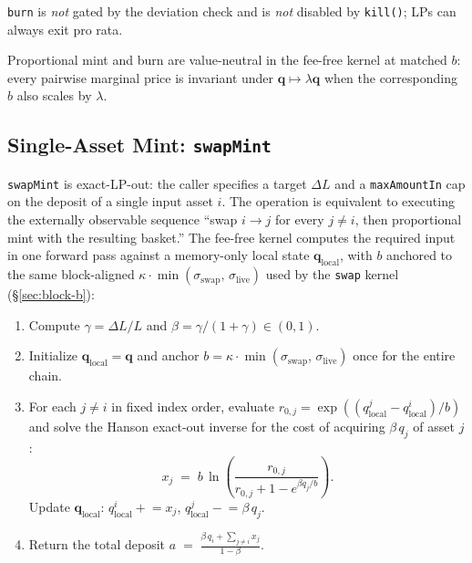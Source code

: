 \documentclass[11pt]{article}
\begin{document}
\texttt{burn} is \emph{not} gated by the deviation check and is
\emph{not} disabled by \texttt{kill()}; LPs can always exit pro rata.

Proportional mint and burn are value-neutral in the fee-free kernel at
matched $b$: every pairwise marginal price is invariant under
$\mathbf{q} \mapsto \lambda\mathbf{q}$ when the corresponding $b$ also
scales by $\lambda$.

\subsection{Single-Asset Mint: \texttt{swapMint}}
\label{sec:swapmint}

\texttt{swapMint} is exact-LP-out: the caller specifies a target
$\Delta L$ and a \texttt{maxAmountIn} cap on the deposit of a single
input asset $i$. The operation is equivalent to executing the
externally observable sequence ``swap $i \to j$ for every $j \ne i$,
then proportional mint with the resulting basket.'' The fee-free
kernel computes the required input in one forward pass against a
memory-only local state $\mathbf{q}_{\mathrm{local}}$, with $b$
anchored to the same block-aligned $\kappa \cdot
\min(\sigma_{\mathrm{swap}},\,\sigma_{\mathrm{live}})$ used by the
\texttt{swap} kernel (\S\ref{sec:block-b}):

\begin{enumerate}
  \item Compute $\gamma = \Delta L / L$ and
        $\beta = \gamma/(1+\gamma) \in (0,1)$.
  \item Initialize $\mathbf{q}_{\mathrm{local}} = \mathbf{q}$ and
        anchor $b = \kappa \cdot \min(\sigma_{\mathrm{swap}},\,
        \sigma_{\mathrm{live}})$ once for the entire chain.
  \item For each $j \ne i$ in fixed index order, evaluate
        $r_{0,j} = \exp((q_{\mathrm{local}}^j -
        q_{\mathrm{local}}^i)/b)$ and solve the Hanson exact-out
        inverse for the cost of acquiring $\beta\,q_j$ of asset $j$:
        \[
          x_j \;=\; b\,\ln\!\left(
            \frac{r_{0,j}}{r_{0,j} + 1 - e^{\beta q_j / b}}\right).
        \]
        Update $\mathbf{q}_{\mathrm{local}}$:
        $q_{\mathrm{local}}^i \mathrel{+}{=} x_j$,
        $q_{\mathrm{local}}^j \mathrel{-}{=} \beta\,q_j$.
  \item Return the total deposit
        $\displaystyle a \;=\; \frac{\beta\,q_i + \sum_{j \ne i} x_j}{1 - \beta}.$
\end{enumerate}
\end{document}
